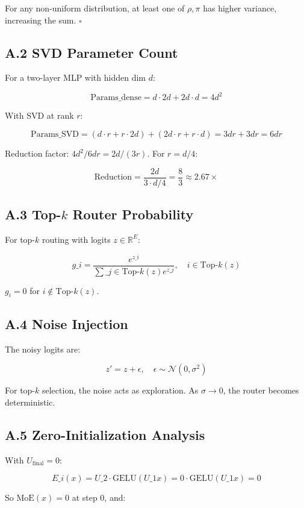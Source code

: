 For any non-uniform distribution, at least one of $\rho, \pi$ has higher 
variance, increasing the sum. $\square$

\subsection{A.2 SVD Parameter Count}

For a two-layer MLP with hidden dim $d$:

\[
\text{Params}\_\text{dense} = d \cdot 2d + 2d \cdot d = 4d^2
\]

With SVD at rank $r$:

\[
\text{Params}\_\text{SVD} = (d \cdot r + r \cdot 2d) + (2d \cdot r + r \cdot d) = 3dr + 3dr = 6dr
\]

Reduction factor: $4d^2 / 6dr = 2d / (3r)$. For $r = d/4$:

\[
\text{Reduction} = \frac{2d}{3 \cdot d/4} = \frac{8}{3} \approx 2.67\times
\]

\subsection{A.3 Top-$k$ Router Probability}

For top-$k$ routing with logits $z \in \mathbb{R}^E$:

\[
g\_i = \frac{e^{z\_i}}{\sum\_{j \in \text{Top-}k(z)} e^{z\_j}}, \quad i \in \text{Top-}k(z)
\]

$g_i = 0$ for $i \notin \text{Top-}k(z)$.

\subsection{A.4 Noise Injection}

The noisy logits are:

\[
z' = z + \epsilon, \quad \epsilon \sim \mathcal{N}(0, \sigma^2)
\]

For top-$k$ selection, the noise acts as exploration. As $\sigma \to 0$, 
the router becomes deterministic.

\subsection{A.5 Zero-Initialization Analysis}

With $U_\text{final} = 0$:

\[
E\_i(x) = U\_2 \cdot \text{GELU}(U\_1 x) = 0 \cdot \text{GELU}(U\_1 x) = 0
\]

So $\text{MoE}(x) = 0$ at step 0, and:

